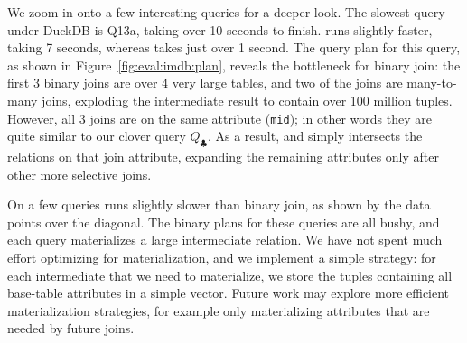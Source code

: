 We zoom in onto a few interesting queries for a deeper look.
The slowest query under DuckDB is Q13a, taking over 10 seconds to finish.
\GJ runs slightly faster, taking 7 seconds,
whereas \FJ takes just over 1 second.
The query plan for this query,
as shown in Figure~\ref{fig:eval:imdb:plan},
reveals the bottleneck for binary join:
the first 3 binary joins are over 4 very large tables,
and two of the joins are many-to-many joins, exploding the
intermediate result to contain over 100 million tuples.
However, all 3 joins are on the same attribute (\lstinline|mid|);
in other words they are quite  similar to our clover query $Q_\clubsuit$.
As a result, \GJ and \FJ simply intersects the relations
on that join attribute,
expanding the remaining attributes only after
other more selective joins.

On a few queries \FJ runs slightly slower than binary join,
as shown by the data points over the diagonal.
The binary plans for these queries are all bushy,
and each query materializes a large intermediate relation.
We have not spent much effort optimizing for materialization,
and we implement a simple strategy: for each intermediate
that we need to materialize, we store the tuples containing
all base-table attributes in a simple vector.
Future work may explore more efficient materialization strategies,
for example only materializing attributes that
are needed by future joins.

